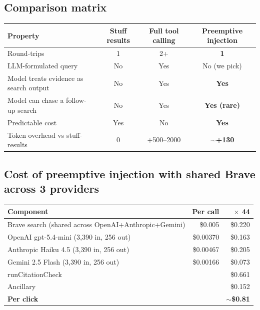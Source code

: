 \documentclass[11pt,letterpaper]{article}
\begin{document}
\subsection{Comparison matrix}

\begin{center}
\begin{tabular}{@{}lccc@{}}
\toprule
\textbf{Property} & \textbf{Stuff results} & \textbf{Full tool calling} & \textbf{Preemptive injection} \\
\midrule
Round-trips                                    & 1           & 2+           & \textbf{1} \\
LLM-formulated query                           & No          & Yes          & No (we pick) \\
Model treats evidence as search output         & No          & Yes          & \textbf{Yes} \\
Model can chase a follow-up search             & No          & Yes          & \textbf{Yes (rare)} \\
Predictable cost                               & Yes         & No           & \textbf{Yes} \\
Token overhead vs stuff-results                & 0           & +500--2000   & \textbf{$\sim$+130} \\
\bottomrule
\end{tabular}
\end{center}

\subsection{Cost of preemptive injection with shared Brave across 3 providers}

\begin{center}
\begin{tabular}{@{}lrr@{}}
\toprule
\textbf{Component} & \textbf{Per call} & \textbf{$\times$ 44} \\
\midrule
Brave search (shared across OpenAI+Anthropic+Gemini) & \$0.005 & \$0.220 \\
OpenAI gpt-5.4-mini (3,390 in, 256 out)              & \$0.00370 & \$0.163 \\
Anthropic Haiku 4.5 (3,390 in, 256 out)              & \$0.00467 & \$0.205 \\
Gemini 2.5 Flash (3,390 in, 256 out)                 & \$0.00166 & \$0.073 \\
\midrule
runCitationCheck & & \$0.661 \\
Ancillary         & & \$0.152 \\
\textbf{Per click} & & \textbf{$\sim$\$0.81} \\
\bottomrule
\end{tabular}
\end{center}
\end{document}
